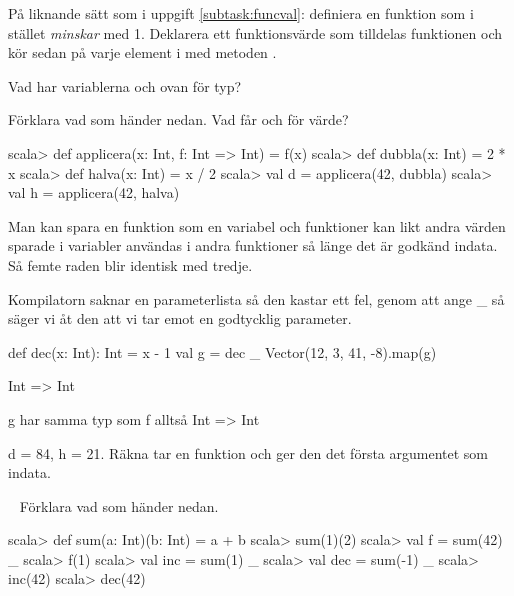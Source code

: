 \Subtask På liknande sätt som i uppgift \ref{subtask:funcval}: definiera en funktion  som i stället \emph{minskar} med 1. Deklarera ett funktionsvärde  som tilldelas funktionen  och kör sedan  på varje element i  med metoden .

\Subtask Vad har variablerna  och  ovan för typ?

\Subtask Förklara vad som händer nedan. Vad får  och  för värde?

\begin{REPL}
scala> def applicera(x: Int, f: Int => Int) = f(x)
scala> def dubbla(x: Int) = 2 * x
scala> def halva(x: Int) = x / 2
scala> val d = applicera(42, dubbla)
scala> val h = applicera(42, halva)
\end{REPL}

\SOLUTION


\TaskSolved \what


\SubtaskSolved  Man kan spara en funktion som en variabel och funktioner kan likt andra värden sparade i variabler användas i andra funktioner så länge det är godkänd indata. Så femte raden blir identisk med tredje.

\SubtaskSolved  Kompilatorn saknar en parameterlista så den kastar ett fel, genom att ange \_ så säger vi åt den att vi tar emot en godtycklig parameter.

\SubtaskSolved
\begin{REPLnonum}
def dec(x: Int): Int = x - 1
val g = dec _
Vector(12, 3, 41, -8).map(g)
\end{REPLnonum}

\SubtaskSolved  Int => Int

g har samma typ som f alltså  Int => Int

\SubtaskSolved  d = 84, h = 21. Räkna tar en funktion och ger den det första argumentet som indata.



\QUESTEND









\QUESTBEGIN

\Task  \what~ Förklara vad som händer nedan.
\begin{REPL}
scala> def sum(a: Int)(b: Int) = a + b
scala> sum(1)(2)
scala> val f = sum(42) _
scala> f(1)
scala> val inc = sum(1) _
scala> val dec = sum(-1) _
scala> inc(42)
scala> dec(42)
\end{REPL}

